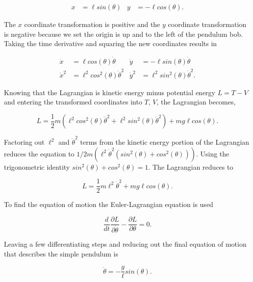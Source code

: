 \documentclass[runningheads]{llncs}
\begin{document}
\begin{align*}
 x &= \ell sin(\theta) & y &= -\ell cos(\theta).
\end{align*}

The $x$ coordinate transformation is positive and the $y$ coordinate transformation is negative because we set the origin is up and to the left of the pendulum bob. Taking the time derivative and squaring the new coordinates results in

\begin{align*}
 \dot{x} &= \ell cos(\theta)\dot{\theta} & \dot{y} &= -\ell sin(\theta)\dot{\theta} \\
 \dot{x}^2 &= \ell^{2}cos^{2}(\theta)\dot{\theta}^{2} & \dot{y}^2 &= \ell^{2}sin^{2}(\theta)\dot{\theta}^{2}.
\end{align*}

Knowing that the Lagrangian is kinetic energy minus potential energy $L = T - V$ and entering the transformed coordinates into $T$, $V$, the Lagrangian becomes,

\begin{equation}
    L = \frac{1}{2}m(\ell^{2}cos^{2}(\theta)\dot{\theta}^{2} + \ell^{2}sin^2(\theta)\dot{\theta}^{2}) + mg\ell cos(\theta).
\end{equation}

Factoring out $\ell^{2}$ and $\dot{\theta}^{2}$ terms from the kinetic energy portion of the Lagrangian reduces the equation to $1/2m(\ell^{2}\dot{\theta}^{2}(sin^{2}(\theta) + cos^{2}(\theta)))$. Using the trigonometric identity $sin^{2}(\theta) + cos^{2}(\theta) = 1$. The Lagrangian reduces to

\begin{equation}
    L = \frac{1}{2}m\ell^{2}\dot{\theta}^{2} + mg\ell cos(\theta).
\end{equation}

To find the equation of motion the Euler-Lagrangian equation is used

\begin{equation}
    \frac{d}{dt}\frac{\partial L}{\partial \dot{\theta}} - \frac{\partial L}{\partial \theta} = 0.
\end{equation}


Leaving a few differentiating steps and reducing out the final equation of motion that describes the simple pendulum is

\begin{equation}
    \ddot{\theta} = -\frac{g}{\ell}sin(\theta).
\end{equation}
\end{document}
